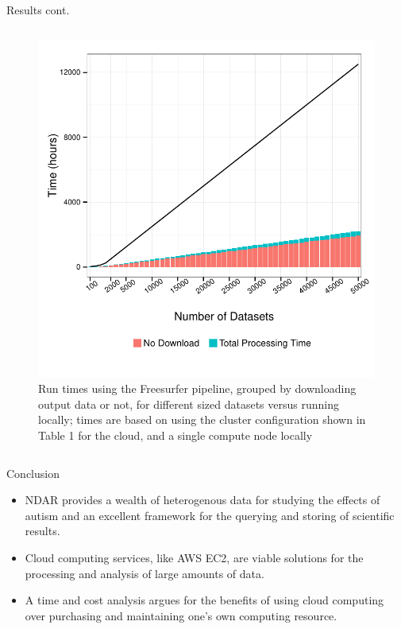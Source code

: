 \documentclass[final,hyperref={pdfpagelabels=false}]{beamer}
\begin{document}
\begin{frame}
\begin{columns}
\begin{column}{.5\textwidth}
{\begin{block}{Results cont.}
\begin{column}{.47\textwidth}
\begin{figure}
                    \includegraphics[width=.99\textwidth]{fs-times.pdf}
                    \caption{\label{fig:fs-times}Run times using the Freesurfer pipeline, grouped by downloading output data or not, for different sized datasets versus running locally; times are based on using the cluster configuration shown in Table 1 for the cloud, and a single compute node locally}
                \end{figure}
            \end{column}
        \end{block}
        \begin{block}{Conclusion}
            \begin{itemize}
                \item NDAR provides a wealth of heterogenous data for studying the effects of autism and an excellent framework for the querying and storing of scientific results.
                \item Cloud computing services, like AWS EC2, are viable solutions for the processing and analysis of large amounts of data.
                \item A time and cost analysis argues for the benefits of using cloud computing over purchasing and maintaining one's own computing resource.

\end{itemize}
\end{block}}
\end{column}
\end{columns}
\end{frame}
\end{document}
